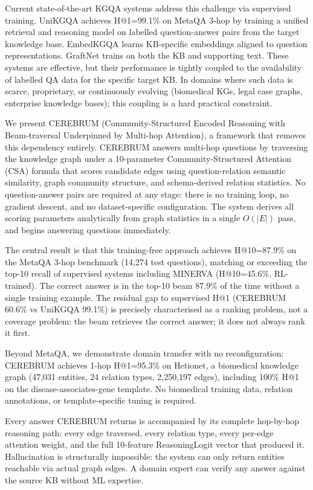 \documentclass[11pt,a4paper]{article}
\begin{document}
Current state-of-the-art KGQA systems address this challenge via supervised
training. UniKGQA \cite{jiang2023} achieves H@1=99.1\% on MetaQA 3-hop
by training a unified retrieval and reasoning model on labelled question-answer
pairs from the target knowledge base. EmbedKGQA \cite{saxena2020improve}
learns KB-specific embeddings aligned to question representations. GraftNet
\cite{sun2018graftnet} trains on both the KB and supporting text. These systems
are effective, but their performance is tightly coupled to the availability of
labelled QA data for the specific target KB. In domains where such data is
scarce, proprietary, or continuously evolving (biomedical KGs, legal case
graphs, enterprise knowledge bases); this coupling is a hard practical
constraint.

We present CEREBRUM (Community-Structured Encoded Reasoning with
Beam-traversal Underpinned by Multi-hop Attention), a framework that removes
this dependency entirely. CEREBRUM answers multi-hop questions by traversing the
knowledge graph under a 10-parameter Community-Structured Attention (CSA) formula
that scores candidate edges using question-relation semantic similarity, graph
community structure, and schema-derived relation statistics. No question-answer
pairs are required at any stage: there is no training loop, no gradient descent,
and no dataset-specific configuration. The system derives all scoring parameters
analytically from graph statistics in a single $O(|E|)$ pass, and begins
answering questions immediately.

The central result is that this training-free approach achieves H@10=87.9\% on
the MetaQA 3-hop benchmark (14,274 test questions), matching or exceeding the
top-10 recall of supervised systems including MINERVA (H@10=45.6\%, RL-trained).
The correct answer is in the top-10 beam 87.9\% of the time without a single
training example. The residual gap to supervised H@1 (CEREBRUM 60.6\% vs
UniKGQA 99.1\%) is precisely characterised as a ranking problem, not a coverage
problem: the beam retrieves the correct answer; it does not always rank it first.

Beyond MetaQA, we demonstrate domain transfer with no reconfiguration: CEREBRUM
achieves 1-hop H@1=95.3\% on Hetionet, a biomedical knowledge graph (47,031
entities, 24 relation types, 2,250,197 edges), including 100\% H@1 on the
disease-associates-gene template. No biomedical training data, relation
annotations, or template-specific tuning is required.

Every answer CEREBRUM returns is accompanied by its complete hop-by-hop
reasoning path: every edge traversed, every relation type, every per-edge
attention weight, and the full 10-feature ReasoningLogit vector that produced it.
Hallucination is structurally impossible: the system can only return entities
reachable via actual graph edges. A domain expert can verify any answer against
the source KB without ML expertise.
\end{document}
